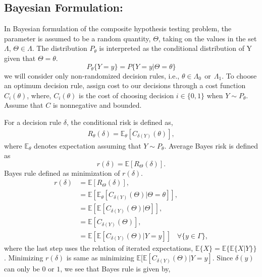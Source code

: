 \documentclass[a4paper,english,12pt]{article}
\begin{document}
\subsection*{Bayesian Formulation:}
In Bayesian formulation of the composite hypothesis testing problem, the parameter is assumed to be a random quantity, $\Theta$, taking on the values in the set $\Lambda$, $\Theta \in \Lambda$. The distribution $P_\theta$ is interpreted as the conditional distribution of Y given that $\Theta = \theta$.
\begin{equation}
P_\theta \{ Y = y \} = P\{ Y=y | \Theta = \theta\} 
\end{equation}
we will consider only non-randomized decision rules, i.e., $\theta \in \Lambda_0~~\mbox{or}~~\Lambda_1$. To choose an optimum decision rule, assign cost to our decisions through a cost function $ C_i (\theta)$, where, $ C_i (\theta)$ is the cost of choosing decision $i \in \{0,1\}$ when $Y \sim P_\theta$. Assume that $C$ is nonnegative and bounded. 
\par For a decision rule $\delta$, the conditional risk is defined as,
\begin{eqnarray}
R_\theta (\delta) = \mathbb{E}_\theta [ C_{ \delta(Y) } (\theta)],
\end{eqnarray}
where $\mathbb{E}_\theta$ denotes expectation assuming that $ Y \sim P_\theta$. Average Bayes risk is defined as 
\begin{equation}
r(\delta) = \mathbb{E} [ R_\Theta (\delta)].
\end{equation}
Bayes rule defined as minimization of $r(\delta)$.
\begin{align}
r(\delta) &= \mathbb{E} [ R_\Theta (\delta)],\\\nonumber
&= \mathbb{E}[\mathbb{E}_\theta[ C_{ \delta(Y) } (\Theta)| \Theta=\theta ]],\\\nonumber
&= \mathbb{E}[\mathbb{E}[ C_{ \delta(Y) } (\Theta)| \Theta ]],\\\nonumber
&= \mathbb{E}[ C_{ \delta(Y) } (\Theta) ],\\\nonumber
&= \mathbb{E}[\mathbb{E}[ C_{ \delta(Y) } (\Theta) | Y=y ]]\hspace{10pt} \forall \{ y \in \Gamma \},
\end{align}
where the last step uses the relation of iterated expectations, $\mathbb{E}\{X\}=\mathbb{E}\{\mathbb{E}\{X|Y\}\}$. Minimizing $r(\delta)$ is same as minimizing $\mathbb{E}[\mathbb{E}[ C_{ \delta(Y) } (\Theta) | Y=y ]$. Since $\delta(y) $ can only be $0$ or $1$, we see that Bayes rule is given by, 
\end{document}

